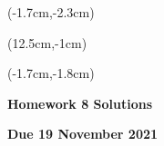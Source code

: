 \documentclass[12pt, oneside]{article}
\begin{document}
\begin{textblock*}{4cm}(-1.7cm,-2.3cm)
\end{textblock*}

\begin{textblock*}{8cm}(12.5cm,-1cm)
\end{textblock*}
\begin{textblock*}{13.5cm}(-1.7cm,-1.8cm)
\end{textblock*}

\vspace{1cm}

\begin{center}
\textbf{\Large Homework 8 Solutions}

\textbf{Due 19 November 2021}
\end{center}
\end{document}
